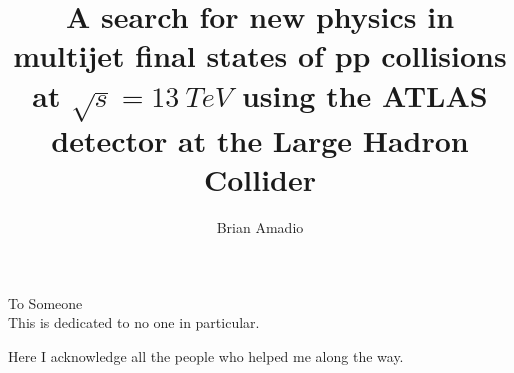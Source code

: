 \documentclass{ucbthesis}
\begin{document}

\title{A search for new physics in multijet
  final states of pp collisions at $\sqrt{s} = 13~TeV$ using the ATLAS
  detector at the Large Hadron Collider}

\author{Brian Amadio}




\maketitle
\copyrightpage



\begin{frontmatter}

\begin{dedication}
\null\vfil
\begin{center}

To Someone\\\vspace{12pt}
This is dedicated to no one in particular. 
\end{center}
\vfil\null
\end{dedication}


\tableofcontents
\clearpage
\listoffigures
\clearpage
\listoftables

\begin{acknowledgements}

Here I acknowledge all the people who helped me along the way.

\end{acknowledgements}

\end{frontmatter}

\pagestyle{headings}













\printbibliography
\end{document}
